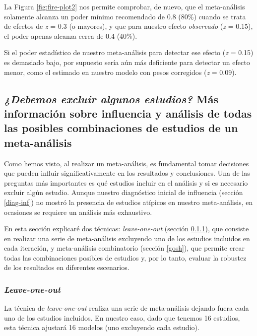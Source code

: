 \documentclass[
  bookmarksnumbered]{article}
\begin{document}
La Figura \ref{fig:fire-plot2} nos permite comprobar, de nuevo, que el meta-análisis solamente alcanza un poder mínimo recomendado de 0.8 (80\%) cuando se trata de efectos de \emph{z} = 0.3 (o mayores), y que para nuestro efecto \emph{observado} (\emph{z} = 0.15), el poder apenas alcanza cerca de 0.4 (40\%).

Si el poder estadístico de nuestro meta-análisis para detectar ese efecto (\emph{z} = 0.15) es demasiado bajo, por supuesto sería aún más deficiente para detectar un efecto menor, como el estimado en nuestro modelo con pesos corregidos (\emph{z} = 0.09).

\hypertarget{todas-combinaciones}{%
\subsection{\texorpdfstring{\emph{¿Debemos excluir algunos estudios?} Más información sobre influencia y análisis de todas las posibles combinaciones de estudios de un meta-análisis}{¿Debemos excluir algunos estudios? Más información sobre influencia y análisis de todas las posibles combinaciones de estudios de un meta-análisis}}\label{todas-combinaciones}}

Como hemos visto, al realizar un meta-análisis, es fundamental tomar decisiones que pueden influir significativamente en los resultados y conclusiones. Una de las preguntas más importantes es qué estudios incluir en el análisis y si es necesario excluir algún estudio. Aunque nuestro diagnóstico inicial de influencia (sección \ref{diag-inf}) no mostró la presencia de estudios atípicos en nuestro meta-análisis, en ocasiones se requiere un análisis más exhaustivo.

En esta sección explicaré dos técnicas: \emph{leave-one-out} (sección \ref{leave-one-out}), que consiste en realizar una serie de meta-análisis excluyendo uno de los estudios incluidos en cada iteración, y meta-análisis combinatorio (sección \ref{gosh}), que permite crear todas las combinaciones posibles de estudios y, por lo tanto, evaluar la robustez de los resultados en diferentes escenarios.

\hypertarget{leave-one-out}{%
\subsubsection{\texorpdfstring{\emph{Leave-one-out}}{Leave-one-out}}\label{leave-one-out}}

La técnica de \emph{leave-one-out} realiza una serie de meta-análisis dejando fuera cada uno de los estudios incluidos. En nuestro caso, dado que tenemos 16 estudios, esta técnica ajustará 16 modelos (uno excluyendo cada estudio).
\end{document}
